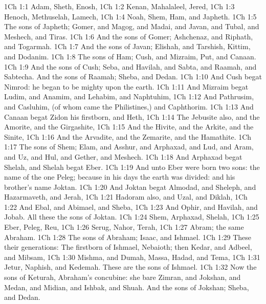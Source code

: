 \vs 1Ch 1:1 Adam, Sheth, Enosh,
\vs 1Ch 1:2 Kenan, Mahalaleel, Jered,
\vs 1Ch 1:3 Henoch, Methuselah, Lamech,
\vs 1Ch 1:4 Noah, Shem, Ham, and Japheth.
\vs 1Ch 1:5 The sons of Japheth; Gomer, and Magog, and Madai, and Javan, and Tubal, and Meshech, and Tiras.
\vs 1Ch 1:6 And the sons of Gomer; Ashchenaz, and Riphath, and Togarmah.
\vs 1Ch 1:7 And the sons of Javan; Elishah, and Tarshish, Kittim, and Dodanim.
\vs 1Ch 1:8 The sons of Ham; Cush, and Mizraim, Put, and Canaan.
\vs 1Ch 1:9 And the sons of Cush; Seba, and Havilah, and Sabta, and Raamah, and Sabtecha. And the sons of Raamah; Sheba, and Dedan.
\vs 1Ch 1:10 And Cush begat Nimrod: he began to be mighty upon the earth.
\vs 1Ch 1:11 And Mizraim begat Ludim, and Anamim, and Lehabim, and Naphtuhim,
\vs 1Ch 1:12 And Pathrusim, and Casluhim, (of whom came the Philistines,) and Caphthorim.
\vs 1Ch 1:13 And Canaan begat Zidon his firstborn, and Heth,
\vs 1Ch 1:14 The Jebusite also, and the Amorite, and the Girgashite,
\vs 1Ch 1:15 And the Hivite, and the Arkite, and the Sinite,
\vs 1Ch 1:16 And the Arvadite, and the Zemarite, and the Hamathite.
\vs 1Ch 1:17 The sons of Shem; Elam, and Asshur, and Arphaxad, and Lud, and Aram, and Uz, and Hul, and Gether, and Meshech.
\vs 1Ch 1:18 And Arphaxad begat Shelah, and Shelah begat Eber.
\vs 1Ch 1:19 And unto Eber were born two sons: the name of the one  Peleg; because in his days the earth was divided: and his brother's name  Joktan.
\vs 1Ch 1:20 And Joktan begat Almodad, and Sheleph, and Hazarmaveth, and Jerah,
\vs 1Ch 1:21 Hadoram also, and Uzal, and Diklah,
\vs 1Ch 1:22 And Ebal, and Abimael, and Sheba,
\vs 1Ch 1:23 And Ophir, and Havilah, and Jobab. All these  the sons of Joktan.
\vs 1Ch 1:24 Shem, Arphaxad, Shelah,
\vs 1Ch 1:25 Eber, Peleg, Reu,
\vs 1Ch 1:26 Serug, Nahor, Terah,
\vs 1Ch 1:27 Abram; the same  Abraham.
\vs 1Ch 1:28 The sons of Abraham; Isaac, and Ishmael.
\vs 1Ch 1:29 These  their generations: The firstborn of Ishmael, Nebaioth; then Kedar, and Adbeel, and Mibsam,
\vs 1Ch 1:30 Mishma, and Dumah, Massa, Hadad, and Tema,
\vs 1Ch 1:31 Jetur, Naphish, and Kedemah. These are the sons of Ishmael.
\vs 1Ch 1:32 Now the sons of Keturah, Abraham's concubine: she bare Zimran, and Jokshan, and Medan, and Midian, and Ishbak, and Shuah. And the sons of Jokshan; Sheba, and Dedan.
